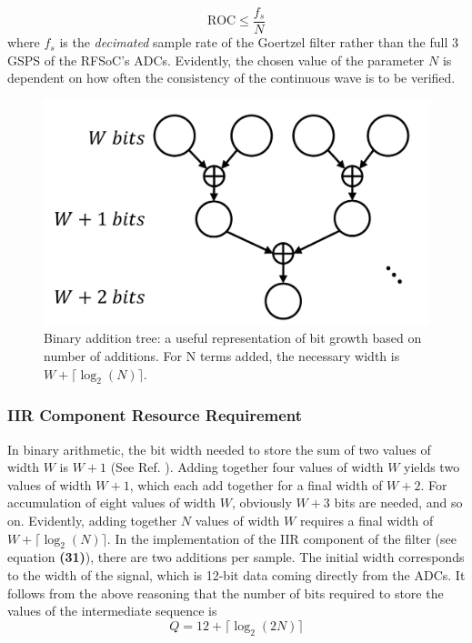 \documentclass[reprint,amsmath,amssymb]{revtex4-2}
\begin{document}
\begin{equation}
    \text{ROC} \leq  \frac{f_s}{N} 
\end{equation}
where $f_s$ is the \textit{decimated} sample rate of the Goertzel filter rather than the full 3 GSPS of the RFSoC's ADCs. Evidently, the chosen value of the parameter $N$ is dependent on how often the consistency of the continuous wave is to be verified.

\begin{figure}
    \centering
    \includegraphics[width=\linewidth]{figs/binary_addition_tree.png}
    \caption{Binary addition tree: a useful representation of bit growth based on number of additions. For N terms added, the necessary width is $W + \lceil\log_2(N)\rceil$.}
    \label{fig:12}
\end{figure}

\subsubsection{IIR Component Resource Requirement}

In binary arithmetic, the bit width needed to store the sum of two values of width $W$ is $W+1$ (See Ref. \cite{fixed-point}). Adding together four values of width $W$ yields two values of width $W+1$, which each add together for a final width of $W+2$. For accumulation of eight values of width $W$, obviously $W+3$ bits are needed, and so on. Evidently, adding together $N$ values of width $W$ requires a final width of $W + \lceil\log_2(N)\rceil$. In the implementation of the IIR component of the filter (see equation \textbf{(31)}), there are two additions per sample. The initial width corresponds to the width of the signal, which is 12-bit data coming directly from the ADCs. It follows from the above reasoning that the number of bits required to store the values of the intermediate sequence is
\begin{equation}
    Q = 12 + \lceil\log_2(2N)\rceil
\end{equation}
\end{document}
